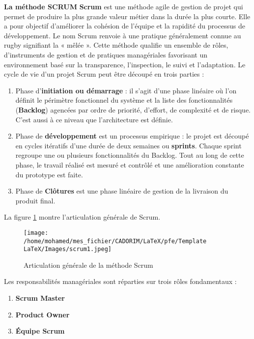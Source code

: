 \documentclass[a4paper, 12pt]{report}
\begin{document}
	\textbf{La méthode SCRUM}
	\newline
	\textbf{Scrum} est une méthode agile de gestion de projet qui permet de produire la plus grande valeur métier dans la durée la plus courte. Elle a pour objectif d’améliorer la cohésion de l’équipe et la rapidité du processus de développement. Le nom Scrum renvoie à une pratique généralement connue au rugby signifiant la « mêlée ». \newline
	Cette méthode qualifie un ensemble de rôles, d’instruments de gestion et de pratiques managériales favorisant un environnement basé sur la transparence, l’inspection, le suivi et l’adaptation. Le cycle de vie d’un projet Scrum peut être découpé en trois parties :
	\begin{enumerate}
		\item Phase d'\textbf{initiation ou démarrage} : il s’agit d’une phase linéaire où l’on définit le périmètre fonctionnel du système et la liste des fonctionnalités (\textbf{Backlog}) agencées par ordre de priorité, d’effort, de complexité et de risque. C’est aussi à ce niveau que l’architecture est définie.
		
		\item Phase de \textbf{développement} est un processus empirique : le projet est découpé en cycles itératifs d’une durée de deux semaines ou \textbf{sprints}. Chaque sprint regroupe une ou plusieurs fonctionnalités du Backlog. Tout au long de cette phase, le travail réalisé est mesuré et contrôlé et une amélioration constante du prototype est faite.
		
		\item Phase de \textbf{Clôtures} est une phase linéaire de gestion de la livraison du produit final.
	\end{enumerate}
	La figure \ref{Scrum} montre l’articulation générale de Scrum. \newline
	\begin{figure}[h]
		\texttt{[image: /home/mohamed/mes\_fichier/CADORIM/LaTeX/pfe/Template LaTeX/Images/scrum1.jpeg]}
		\centering
		\caption{Articulation générale de la méthode Scrum}
		\label{Scrum}
	\end{figure}
	Les responsabilités managériales sont réparties sur trois rôles fondamentaux :
	\begin{enumerate}
		\item \textbf{Scrum Master}
		\item \textbf{Product Owner}
		\item \textbf{Équipe Scrum}
		\newline
	\end{enumerate}
\end{document}
